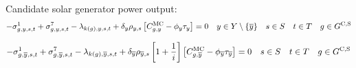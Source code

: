 \documentclass{article}
\begin{document}

Candidate solar generator power output:
\begin{equation}
-\dMinPowerOutput + \dMaxPowerOutputSolarCandidate - \dPowerBalance[k(\iGenerator),\iYear,\iScenario,\iInterval] + \cDiscountRate \cScenarioDuration \left[\cMarginalCost - \vBaseline\vPermitPrice \right] = 0 \quad \iYear \in \sYears \setminus \{\iYearTerminal\} \quad \iScenario \in \sScenarios \quad \iInterval \in \sIntervals \quad \iGenerator \in \sGeneratorsCandidateSolar
\end{equation}

\begin{equation}
-\dMinPowerOutput[\iGenerator,\iYearTerminal,\iScenario,\iInterval] + \dMaxPowerOutputSolarCandidate[\iGenerator,\iYearTerminal,\iScenario,\iInterval] - \dPowerBalance[k(\iGenerator),\iYearTerminal,\iScenario,\iInterval] + \cDiscountRate[\iYearTerminal] \cScenarioDuration[\iYearTerminal,\iScenario] \left[1 + \frac{1}{\cInterestRate}\right] \left[\cMarginalCost[\iGenerator,\iYearTerminal] - \vBaseline[\iYearTerminal]\vPermitPrice[\iYearTerminal] \right] = 0 \quad \iScenario \in \sScenarios \quad \iInterval \in \sIntervals \quad \iGenerator \in \sGeneratorsCandidateSolar
\end{equation}
\end{document}
